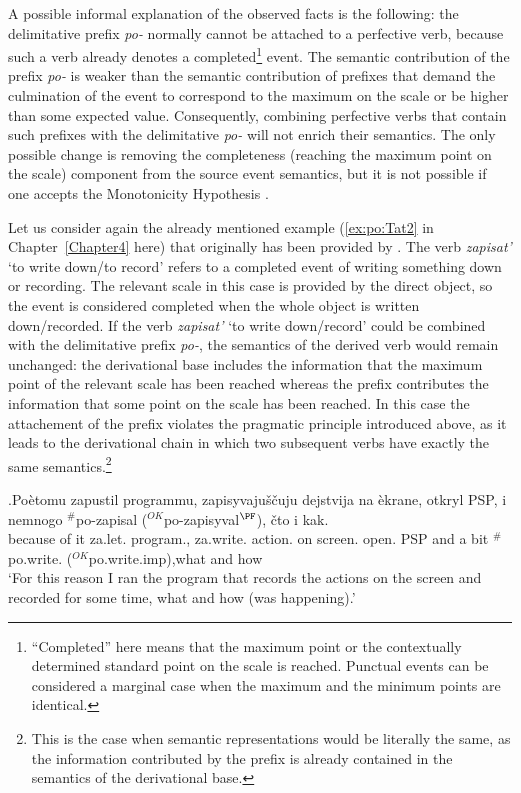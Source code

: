A possible informal explanation of the observed facts is the following: the delimitative prefix \textit{po-} normally cannot be attached to a perfective verb, because such a verb already denotes a completed\footnote{``Completed'' here means that the maximum point or the contextually determined standard point on the scale is reached. Punctual events can be considered a marginal case when the maximum and the minimum points are identical.} event. The semantic contribution of the prefix \textit{po-} is weaker than the semantic contribution of prefixes that demand the culmination of the event to correspond to the maximum on the scale or be higher than some expected value. Consequently, combining perfective verbs that contain such prefixes with the delimitative \textit{po-} will not enrich their semantics. The only possible change is removing the completeness (reaching the maximum point on the scale) component from the source event semantics, but it is not possible if one accepts the Monotonicity Hypothesis \citep{Kiparsky:82}.

Let us consider again the already mentioned example (\ref{ex:po:Tat2} in Chapter~\ref{Chapter4} here) that originally has been provided by \citet{Tatevosov:09}. The verb \textit{zapisat'} `to write down/to record' refers to a completed event of writing something down or recording. The relevant scale in this case is provided by the direct object, so the event is considered completed when the whole object is written down/recorded. If the verb \textit{zapisat'} `to write down/record' could be combined with the delimitative prefix \textit{po-}, the semantics of the derived verb would remain unchanged: the derivational base includes the information that the maximum point of the relevant scale has been reached whereas the prefix contributes the information that some point on the scale has been reached. In this case the attachement of the prefix violates the pragmatic principle introduced above, as it leads to the derivational chain in which two subsequent verbs have exactly the same semantics.\footnote{This is the case when semantic representations would be literally the same, as the information contributed by the prefix is already contained in the semantics of the derivational base.}

\exg.\label{ex:po:Tat2:rep}Po\`{e}tomu zapustil programmu, zapisyvaju\v{s}\v{c}uju dejstvija na \`{e}krane, otkryl PSP, i nemnogo $^\#$po-zapisal ($^{\textit{OK}}$po-zapisyval$^{\PF}$), \v{c}to i kak.\\
{because of it} za.let. program., za.write. action. on screen. open. PSP and {a bit} $^\#$po.write. ($^{\textit{OK}}$po.write.imp),what and how\\
\trans `For this reason I ran the program that records the actions on the screen and recorded for some time, what and how (was happening).'\\ 

